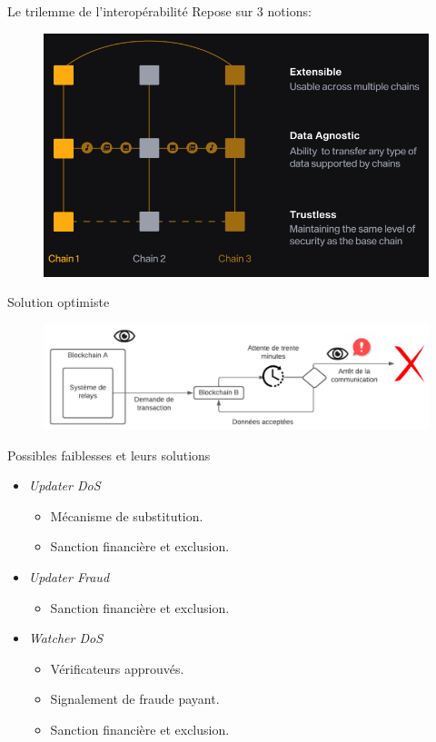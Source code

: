 \begin{frame}{Le trilemme de l’interopérabilité}
    Repose sur 3 notions: 
    \begin{figure}
        \centering
        \includegraphics[scale = 0.7]{centralisation/img_bridges/3notions.png}
    \end{figure}
    \end{frame}

\begin{frame}{Solution optimiste}
    \begin{figure}
       \centering
       \includegraphics[scale = 0.6]{centralisation/img_bridges/VerifOptimiste.png}
    \end{figure}
\end{frame}    

\begin{frame}{Possibles faiblesses et leurs solutions}
\begin{itemize}
    \item \textit{Updater DoS}
        \begin{itemize}
            \item Mécanisme de substitution.
            \item Sanction financière et exclusion.
        \end{itemize}
    \item \textit{Updater Fraud} \begin{itemize} \item Sanction financière et exclusion. \end{itemize}
    \item \textit{Watcher DoS} 
        \begin{itemize}
            \item Vérificateurs approuvés.
            \item Signalement de fraude payant.
            \item Sanction financière et exclusion.
        \end{itemize}
\end{itemize}
\end{frame}
